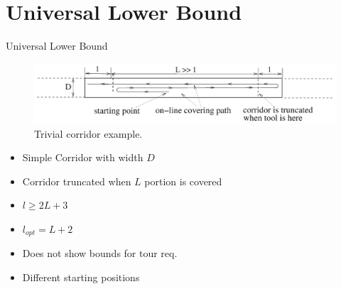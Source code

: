 \documentclass{beamer}
\begin{document}
\section{Universal Lower Bound}
\begin{frame}{Universal Lower Bound}
    \begin{figure}
        \includegraphics[width=\linewidth]{Images/inv_fig12.png}
        \caption{Trivial corridor example.}
    \end{figure}
    \begin{itemize}
        \item Simple Corridor with width $D$
        \item Corridor truncated when $L$ portion is covered
        \item $l \geq 2L + 3$
        \item $l_{opt} = L + 2$
        \item Does not show bounds for tour req.
        \item Different starting positions
    \end{itemize}
\end{frame}
\end{document}
